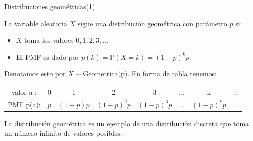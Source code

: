 \documentclass[10pt]{beamer}
\begin{document}
\begin{frame}{Distribuciones geom\'etricas(1)}
\small{La variable aleatoria $X$ sigue una distribuci\'on geom\'etrica con par\'ametro $p$ si:
	
\begin{itemize}
	\item $X$ toma los valores $0,1,2, 3, \dots$
	\item El PMF es dado por $p(k) = \mathbb{P}(X = k) = (1 - p)^kp.$
\end{itemize}

Denotamos esto por $X \sim \text{Geometrica(p)}$. En forma de tabla tenemos:

\begin{table}[]
	\centering
	\begin{tabular}{cccccccc}
		valor a : & 0  & 1 &  2 & 3  & ...& k & ...\\
		PMF p(a): & $p$ & $(1 -p)p$  & $(1 -p)^2p$  & $(1 -p)^3p$  & ...& $(1 -p)^kp$&...   
	\end{tabular}
\end{table}

La distribuci\'on geom\'etrica es un ejemplo de una distribuci\'on discreta que toma un n\'umero infinito de valores posibles.	
}
\end{frame}
\end{document}
